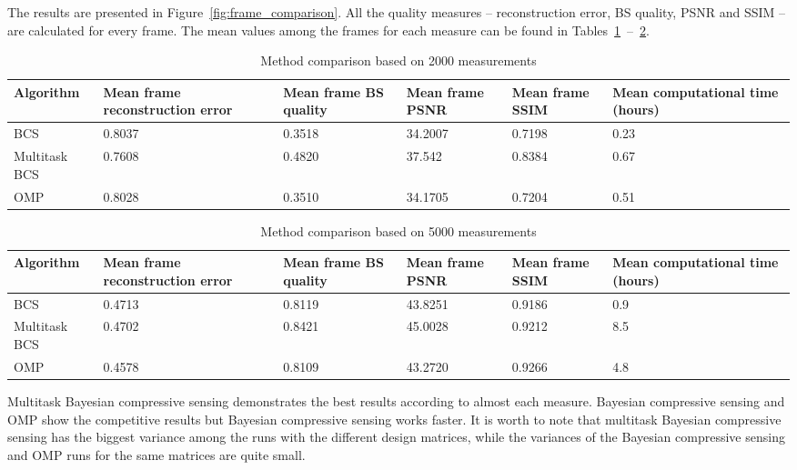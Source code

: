 \documentclass[conference]{IEEEtran}
\begin{document}
The results are presented in Figure~\ref{fig:frame_comparison}. All the quality measures -- reconstruction error, BS quality, PSNR and SSIM -- are calculated for every frame. The mean values among the frames for each measure can be found in Tables~\ref{tbl:2ktimes}~--~\ref{tbl:5ktimes}.

\begin{table}[!t]\footnotesize
  \caption{Method comparison based on 2000 measurements}
    \begin{tabular}{ | p{1cm} | p{1cm} | p{1cm} | p{1cm} | p{1cm} | p{1cm} | }
    \hline
    Algorithm & Mean frame reconstruction error & Mean frame BS quality  & Mean frame PSNR & Mean frame SSIM & Mean computational time (hours)\footnotemark\\ \hline
    BCS & 0.8037 & 0.3518 & 34.2007 & 0.7198  & 0.23\\ \hline
    Multitask BCS & 0.7608 & 0.4820 & 37.542 & 0.8384 & 0.67\\ \hline
    OMP & 0.8028 & 0.3510 & 34.1705 & 0.7204 & 0.51\\
    \hline
    \end{tabular}
\label{tbl:2ktimes}
\end{table}
 
\begin{table}[!t]\footnotesize
  \caption{Method comparison based on 5000 measurements }
    \begin{tabular}{ | p{1cm} | p{1cm} | p{1cm} | p{1cm} | p{1cm} |  p{1cm} | }
    \hline
    Algorithm & Mean frame reconstruction error & Mean frame BS quality & Mean frame PSNR & Mean frame SSIM & Mean computational time (hours)\footnotemark[\value{footnote}]\\ \hline
    BCS & 0.4713 & 0.8119 & 43.8251 & 0.9186 & 0.9\\ \hline
    Multitask BCS & 0.4702 & 0.8421 & 45.0028 & 0.9212 & 8.5\\ \hline
    OMP & 0.4578 & 0.8109 & 43.2720 & 0.9266 & 4.8\\
    \hline
    \end{tabular}
\label{tbl:5ktimes}
\end{table}

Multitask Bayesian compressive sensing demonstrates the best results according to almost each measure. Bayesian compressive sensing and OMP show the competitive results but Bayesian compressive sensing works faster. It is worth to note that multitask Bayesian compressive sensing has the biggest variance among the runs with the different design matrices, while the variances of the Bayesian compressive sensing and OMP runs for the same matrices are quite small. 
\end{document}
